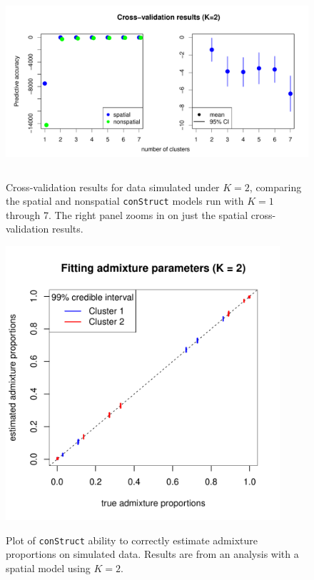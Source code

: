 \documentclass[12pt]{article}
\begin{document}
\begin{figure}
	\centering
		{\includegraphics[width=5in,height=2.5in]{figs/sims/simK2_std_xval.pdf}}
		\caption{
			Cross-validation results for data simulated under $K=2$,
			comparing the spatial and nonspatial \texttt{conStruct} models run with $K=1$ through 7.  
			The right panel zooms in on just the spatial cross-validation results.
		}\label{simK2_xval}
\end{figure}

\begin{figure}
	\centering
		{\includegraphics[width=4in,height=4in]{figs/sims/simK2_adprop_fit.pdf}}
		\caption{
			Plot of \texttt{conStruct} ability to correctly estimate admixture proportions on simulated data.
			Results are from an analysis with a spatial model using $K=2$.
		}\label{simK2_adprop_fit}
\end{figure}
\end{document}

